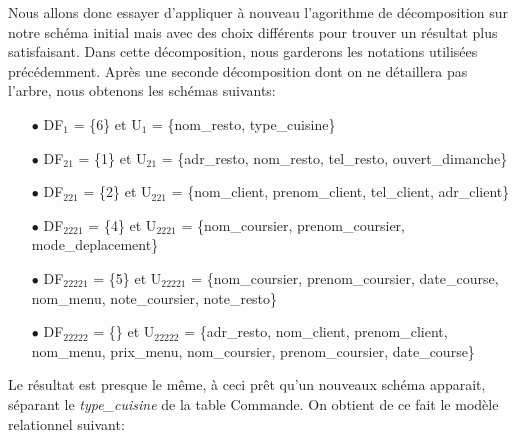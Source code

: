 \documentclass[french]{article}
\begin{document}
        Nous allons donc essayer d'appliquer à nouveau l'agorithme de décomposition sur notre schéma initial mais avec des choix différents pour trouver un résultat plus satisfaisant. Dans cette décomposition, nous garderons les notations utilisées précédemment.\newline
        Après une seconde décomposition dont on ne détaillera pas l'arbre, nous obtenons les schémas suivants:\bigskip
        \begin{enumerate}
            \item[$\bullet$] DF$_{1}$ = \{6\} et U$_{1}$ = \{nom\_resto, type\_cuisine\}
            \item[$\bullet$] DF$_{21}$ = \{1\} et U$_{21}$ = \{adr\_resto, nom\_resto, tel\_resto, ouvert\_dimanche\}
            \item[$\bullet$] DF$_{221}$ = \{2\} et U$_{221}$ = \{nom\_client, prenom\_client, tel\_client, adr\_client\}
            \item[$\bullet$] DF$_{2221}$ = \{4\} et U$_{2221}$ = \{nom\_coursier, prenom\_coursier, mode\_deplacement\}
            \item[$\bullet$] DF$_{22221}$ = \{5\} et U$_{22221}$ = \{nom\_coursier, prenom\_coursier, date\_course, nom\_menu, \newline note\_coursier, note\_resto\} 
            \item[$\bullet$] DF$_{22222}$ = \{\} et U$_{22222}$ = \{adr\_resto, nom\_client, prenom\_client, nom\_menu, prix\_menu, nom\_coursier, prenom\_coursier, date\_course\}\bigskip
        \end{enumerate}
        Le résultat est presque le même, à ceci prêt qu'un nouveaux schéma apparait, séparant le \newline 
        \emph{type\_cuisine} de la table Commande. On obtient de ce fait le modèle relationnel suivant:\bigskip
\end{document}
